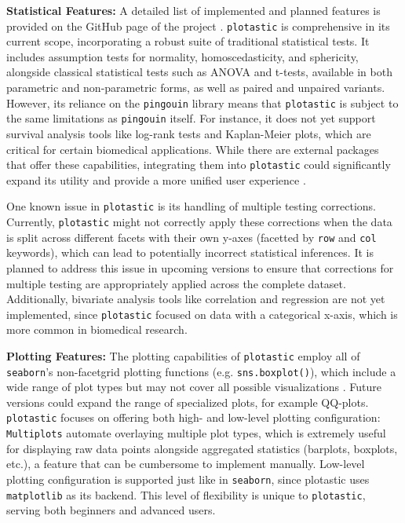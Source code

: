 \textbf{Statistical Features:}
A detailed list of implemented and planned features is provided on the GitHub
page of the project \cite{kuricMarkur4Plotastic2024}. \texttt{plotastic} is
comprehensive in its current scope, incorporating a robust suite of traditional
statistical tests. It includes assumption tests for normality, homoscedasticity,
and sphericity, alongside classical statistical tests such as ANOVA and t-tests,
available in both parametric and non-parametric forms, as well as paired and
unpaired variants. However, its reliance on the \texttt{pingouin} library means
that \texttt{plotastic} is subject to the same limitations as \texttt{pingouin}
itself. For instance, it does not yet support survival analysis tools like
log-rank tests and Kaplan-Meier plots, which are critical for certain biomedical
applications. While there are external packages that offer these capabilities,
integrating them into \texttt{plotastic} could significantly expand its utility
and provide a more unified user experience
\cite{davidson-pilonLifelinesSurvivalAnalysis2019}.

One known issue in \texttt{plotastic} is its handling of multiple testing
corrections. Currently, \texttt{plotastic} might not correctly apply these
corrections when the data is split across different facets with their own y-axes
(facetted by \texttt{row} and \texttt{col} keywords), which can lead to
potentially incorrect statistical inferences. It is planned to address this
issue in upcoming versions to ensure that corrections for multiple testing are
appropriately applied across the complete dataset. Additionally, bivariate
analysis tools like correlation and regression are not yet implemented, since
\texttt{plotastic} focused on data with a categorical x-axis, which is more
common in biomedical research.


\textbf{Plotting Features:} The plotting capabilities of \texttt{plotastic}
employ all of \texttt{seaborn}'s non-facetgrid plotting functions (e.g.
\texttt{sns.boxplot()}), which include a wide range of plot types but may not
cover all possible visualizations \cite{waskomSeabornStatisticalData2021}.
Future versions could expand the range of specialized plots, for example
QQ-plots. \texttt{plotastic} focuses on offering both high- and low-level
plotting configuration: \texttt{Multiplots} automate overlaying multiple plot
types, which is extremely useful for displaying raw data points alongside
aggregated statistics (barplots, boxplots, etc.), a feature that can be
cumbersome to implement manually. Low-level plotting configuration is supported
just like in \texttt{seaborn}, since plotastic uses \texttt{matplotlib} as its
backend. This level of flexibility is unique to \texttt{plotastic}, serving both
beginners and advanced users.

